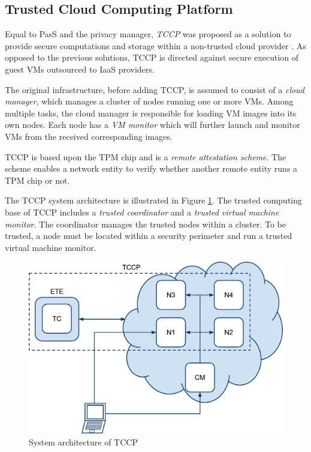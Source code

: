 \documentclass[pdftex,english,10pt,b5paper,twoside]{book}
\begin{document}
\subsection{Trusted Cloud Computing Platform}

Equal to \acl{PasS} and the privacy manager, \emph{\ac{TCCP}} was proposed as a
solution to provide secure computations and storage within a non-trusted cloud
provider \cite{tccp}. As opposed to the previous solutions, \ac{TCCP} is
directed against secure execution of guest \acp{VM} outsourced to \ac{IaaS}
providers.

The original infrastructure, before adding \ac{TCCP}, is assumed to
consist of a \emph{cloud manager}, which manages a cluster of nodes running one or more
\acp{VM}. Among multiple tasks, the cloud manager is responsible for loading \ac{VM}
images into its own nodes.  Each node has a \emph{\ac{VM} monitor} which will further
launch and monitor \acp{VM} from the received corresponding images.

\ac{TCCP} is based upon the \ac{TPM} chip and is a \emph{remote attestation
scheme}.  The scheme enables a network entity to verify whether another remote
entity runs a \ac{TPM} chip or not.

The \ac{TCCP} system architecture is illustrated in Figure \ref{fig:RW:TCCP}.
The trusted computing base of \ac{TCCP} includes a \emph{trusted coordinator}
and a \emph{trusted virtual machine monitor}. The coordinator manages the
trusted nodes within a cluster. To be trusted, a node must be located within a
security perimeter and run a trusted virtual machine monitor.

\begin{figure}[h!]
    \centering
    \includegraphics[scale=0.4]{ArchitectureTCCP.pdf}
    \caption{System architecture of TCCP}
    \label{fig:RW:TCCP}
\end{figure}
\end{document}
